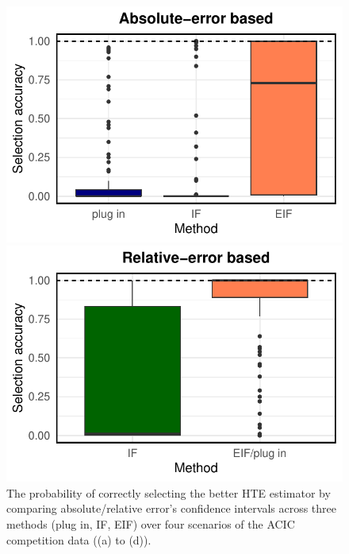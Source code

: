 \documentclass{article}
\theoremstyle{plain}
\theoremstyle{definition}
\theoremstyle{plain}
\begin{document}
\begin{figure}[h]
\begin{minipage}{0.3\textwidth}
                \includegraphics[clip, trim = 0cm 0cm 0cm 0cm, width = \textwidth]{plot/ACIC_nonlinear_propensity_nonlinear_HTE_selection_accuracy_absolute_error.pdf}
        \end{minipage}
            \begin{minipage}{0.3\textwidth}
                \centering
                \includegraphics[clip, trim = 0cm 0cm 0cm 0cm, width = \textwidth]{plot/ACIC_nonlinear_propensity_nonlinear_HTE_selection_accuracy_relative_error.pdf}
        \end{minipage}
        \caption{
        The probability of correctly selecting the better HTE estimator by comparing absolute/relative error's confidence intervals across three methods (plug in, IF, EIF) over four scenarios of the ACIC competition data ((a) to (d)).   
        }
    \label{fig:ACIC.selection.accuracy}
\end{figure}
\end{document}
